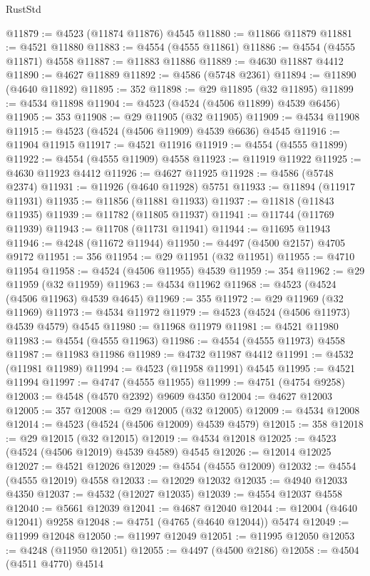 \begin{lexlean}{RustStd}
\begin{coremodule}
@11879 := @4523 (@11874 @11876) @4545
@11880 := @11866 @11879
@11881 := @4521 @11880
@11883 := @4554 (@4555 @11861)
@11886 := @4554 (@4555 @11871) @4558
@11887 := @11883 @11886
@11889 := @4630 @11887 @4412
@11890 := @4627 @11889
@11892 := @4586 (@5748 @2361)
@11894 := @11890 (@4640 @11892)
@11895 := 352
@11898 := @29 @11895 (@32 @11895)
@11899 := @4534 @11898
@11904 := @4523 (@4524 (@4506 @11899) @4539 @6456)
@11905 := 353
@11908 := @29 @11905 (@32 @11905)
@11909 := @4534 @11908
@11915 := @4523 (@4524 (@4506 @11909) @4539 @6636) @4545
@11916 := @11904 @11915
@11917 := @4521 @11916
@11919 := @4554 (@4555 @11899)
@11922 := @4554 (@4555 @11909) @4558
@11923 := @11919 @11922
@11925 := @4630 @11923 @4412
@11926 := @4627 @11925
@11928 := @4586 (@5748 @2374)
@11931 := @11926 (@4640 @11928) @5751
@11933 := @11894 (@11917 @11931)
@11935 := @11856 (@11881 @11933)
@11937 := @11818 (@11843 @11935)
@11939 := @11782 (@11805 @11937)
@11941 := @11744 (@11769 @11939)
@11943 := @11708 (@11731 @11941)
@11944 := @11695 @11943
@11946 := @4248 (@11672 @11944)
@11950 := @4497 (@4500 @2157) @4705 @9172
@11951 := 356
@11954 := @29 @11951 (@32 @11951)
@11955 := @4710 @11954
@11958 := @4524 (@4506 @11955) @4539
@11959 := 354
@11962 := @29 @11959 (@32 @11959)
@11963 := @4534 @11962
@11968 := @4523 (@4524 (@4506 @11963) @4539 @4645)
@11969 := 355
@11972 := @29 @11969 (@32 @11969)
@11973 := @4534 @11972
@11979 := @4523 (@4524 (@4506 @11973) @4539 @4579) @4545
@11980 := @11968 @11979
@11981 := @4521 @11980
@11983 := @4554 (@4555 @11963)
@11986 := @4554 (@4555 @11973) @4558
@11987 := @11983 @11986
@11989 := @4732 @11987 @4412
@11991 := @4532 (@11981 @11989)
@11994 := @4523 (@11958 @11991) @4545
@11995 := @4521 @11994
@11997 := @4747 (@4555 @11955)
@11999 := @4751 (@4754 @9258)
@12003 := @4548 (@4570 @2392) @9609 @4350
@12004 := @4627 @12003
@12005 := 357
@12008 := @29 @12005 (@32 @12005)
@12009 := @4534 @12008
@12014 := @4523 (@4524 (@4506 @12009) @4539 @4579)
@12015 := 358
@12018 := @29 @12015 (@32 @12015)
@12019 := @4534 @12018
@12025 := @4523 (@4524 (@4506 @12019) @4539 @4589) @4545
@12026 := @12014 @12025
@12027 := @4521 @12026
@12029 := @4554 (@4555 @12009)
@12032 := @4554 (@4555 @12019) @4558
@12033 := @12029 @12032
@12035 := @4940 @12033 @4350
@12037 := @4532 (@12027 @12035)
@12039 := @4554 @12037 @4558
@12040 := @5661 @12039
@12041 := @4687 @12040
@12044 := @12004 (@4640 @12041) @9258
@12048 := @4751 (@4765 (@4640 @12044)) @5474
@12049 := @11999 @12048
@12050 := @11997 @12049
@12051 := @11995 @12050
@12053 := @4248 (@11950 @12051)
@12055 := @4497 (@4500 @2186)
@12058 := @4504 (@4511 @4770) @4514

\end{coremodule}
\end{lexlean}
